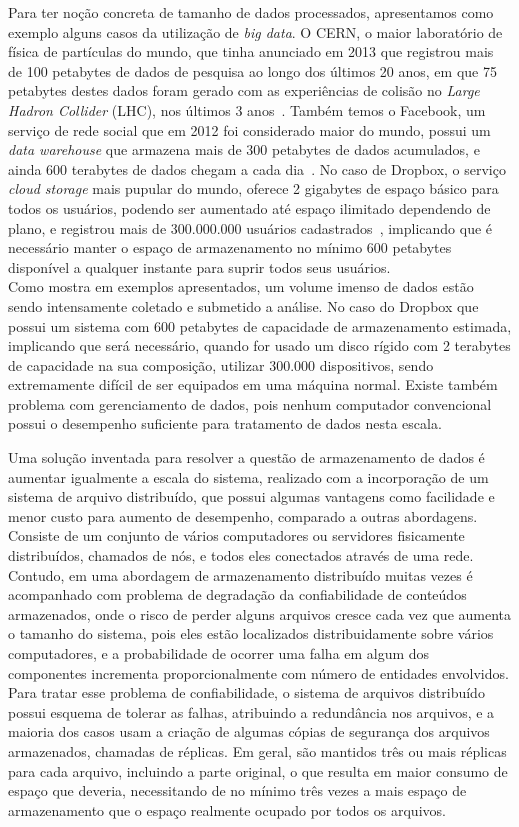 	Para ter noção concreta de tamanho de dados processados, apresentamos como exemplo alguns casos da utilização de \textit{big data}. O CERN, o maior laboratório de física de partículas do mundo, que tinha anunciado em 2013 que registrou mais de 100 petabytes de dados de pesquisa ao longo dos últimos 20 anos, em que 75 petabytes destes dados foram gerado com as experiências de colisão no \textit{Large Hadron Collider} (LHC), nos últimos 3 anos~\cite{cern}. Também temos o Facebook, um serviço de rede social que em 2012 foi considerado maior do mundo, possui um \textit{data warehouse} que armazena mais de 300 petabytes de dados acumulados, e ainda 600 terabytes de dados chegam a cada dia~\cite{facebook14}. No caso de Dropbox, o serviço \textit{cloud storage} mais pupular do mundo, oferece 2 gigabytes de espaço básico para todos os usuários, podendo ser aumentado até espaço ilimitado dependendo de plano, e registrou mais de 300.000.000 usuários cadastrados~\cite{dropbox}, implicando que é necessário manter o espaço de armazenamento no mínimo 600 petabytes disponível a qualquer instante para suprir todos seus usuários.\\
	
	Como mostra em exemplos apresentados, um volume imenso de dados estão sendo intensamente coletado e submetido a análise. No caso do Dropbox que possui um sistema com 600 petabytes de capacidade de armazenamento estimada, implicando que será necessário, quando for usado um disco rígido com 2 terabytes de capacidade na sua composição, utilizar 300.000 dispositivos, sendo extremamente difícil de ser equipados em uma máquina normal. Existe também problema com gerenciamento de dados, pois nenhum computador convencional possui o desempenho suficiente para tratamento de dados nesta escala. 
	
	
	Uma solução inventada para  resolver a questão de armazenamento de dados é aumentar igualmente a escala do sistema, realizado com a incorporação de um sistema de arquivo distribuído, que possui algumas vantagens como facilidade e menor custo para aumento de desempenho, comparado a outras abordagens. Consiste de um conjunto de vários computadores ou servidores fisicamente distribuídos, chamados de nós, e todos eles conectados através de uma rede. Contudo, em uma abordagem de armazenamento distribuído muitas vezes é  acompanhado com problema de degradação da confiabilidade de conteúdos armazenados, onde o risco de perder alguns arquivos cresce cada vez que aumenta o tamanho do sistema, pois eles estão localizados distribuidamente sobre vários computadores, e a probabilidade de ocorrer uma falha em algum dos componentes incrementa proporcionalmente com número de entidades envolvidos. Para tratar esse problema de confiabilidade, o sistema de arquivos distribuído possui esquema de tolerar as falhas, atribuindo a redundância nos arquivos, e a maioria dos casos usam a criação de algumas cópias de segurança dos arquivos armazenados, chamadas de réplicas. Em geral, são mantidos três ou mais réplicas para cada arquivo, incluindo a parte original, o que resulta em maior consumo de espaço que deveria, necessitando de no mínimo três vezes a mais espaço de armazenamento que o espaço realmente ocupado por todos os arquivos.
	
